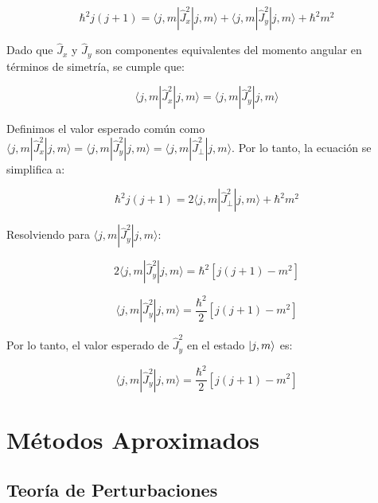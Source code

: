 \begin{equation}
\hbar^2 j(j+1) = \langle j, m | \hat{J}_x^2 | j, m \rangle + \langle j, m | \hat{J}_y^2 | j, m \rangle + \hbar^2 m^2
\end{equation}

Dado que $\hat{J}_x$ y $\hat{J}_y$ son componentes equivalentes del momento angular en términos de simetría, se cumple que:

\begin{equation}
\langle j, m | \hat{J}_x^2 | j, m \rangle = \langle j, m | \hat{J}_y^2 | j, m \rangle
\end{equation}

Definimos el valor esperado común como $\langle j, m | \hat{J}_x^2 | j, m \rangle = \langle j, m | \hat{J}_y^2 | j, m \rangle = \langle j, m | \hat{J}_\perp^2 | j, m \rangle$. Por lo tanto, la ecuación se simplifica a:

\begin{equation}
\hbar^2 j(j+1) = 2 \langle j, m | \hat{J}_\perp^2 | j, m \rangle + \hbar^2 m^2
\end{equation}

Resolviendo para $\langle j, m | \hat{J}_y^2 | j, m \rangle$:

\begin{equation}
2 \langle j, m | \hat{J}_y^2 | j, m \rangle = \hbar^2 \left[ j(j+1) - m^2 \right]
\end{equation}

\begin{equation}
\langle j, m | \hat{J}_y^2 | j, m \rangle = \frac{\hbar^2}{2} \left[ j(j+1) - m^2 \right]
\end{equation}

Por lo tanto, el valor esperado de $\hat{J}_y^2$ en el estado $\ket{j, m}$ es:

\begin{equation}
\langle j, m | \hat{J}_y^2 | j, m \rangle = \frac{\hbar^2}{2} \left[ j(j+1) - m^2 \right]
\end{equation}











\chapter{Métodos Aproximados}

\section{Teoría de Perturbaciones}

